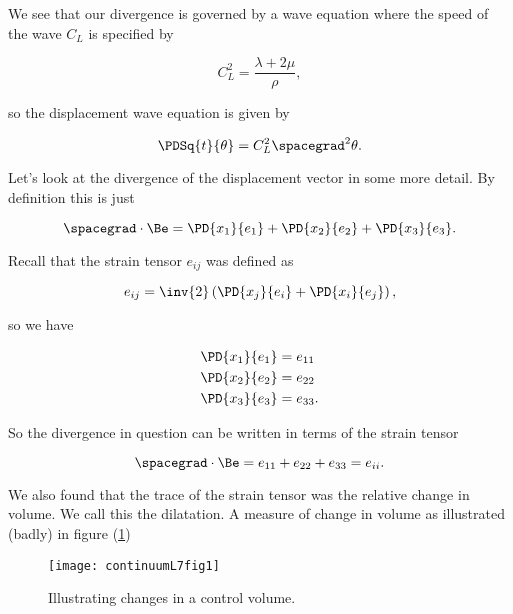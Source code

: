 We see that our divergence is governed by a wave equation where the speed of the wave $C_L$ is specified by

\begin{equation}\label{eqn:continuumL7:70}
C_L^2 = \frac{\lambda + 2 \mu}{\rho},
\end{equation}

so the displacement wave equation is given by

\begin{equation}\label{eqn:continuumL7:90}
\PDSq{t}{\theta} = C_L^2 \spacegrad^2 \theta.
\end{equation}

Let's look at the divergence of the displacement vector in some more detail.  By definition this is just

\begin{equation}\label{eqn:continuumL7:110}
\spacegrad \cdot \Be = 
\PD{x_1}{e_1}
+\PD{x_2}{e_2}
+\PD{x_3}{e_3}.
\end{equation}

Recall that the strain tensor $e_{ij}$ was defined as

\begin{equation}\label{eqn:continuumL7:130}
e_{ij} = \inv{2} \left( 
\PD{x_j}{e_i}
+
\PD{x_i}{e_j}
\right),
\end{equation}

so we have

\begin{align}\label{eqn:continuumL7:150}
\PD{x_1}{e_1} &= e_{11} \\
\PD{x_2}{e_2} &= e_{22} \\
\PD{x_3}{e_3} &= e_{33}.
\end{align}

So the divergence in question can be written in terms of the strain tensor

\begin{equation}\label{eqn:continuumL7:170}
\spacegrad \cdot \Be = 
e_{11}
+e_{22}
+e_{33} = e_{ii}.
\end{equation}

We also found that the trace of the strain tensor was the relative change in volume.  We call this the dilatation.  A measure of change in volume as illustrated (badly) in figure (\ref{fig:continuumL7:continuumL7fig1})

\begin{figure}[htp]
   \centering
   \texttt{[image: continuumL7fig1]}
   \caption{Illustrating changes in a control volume.}\label{fig:continuumL7:continuumL7fig1}
\end{figure}

